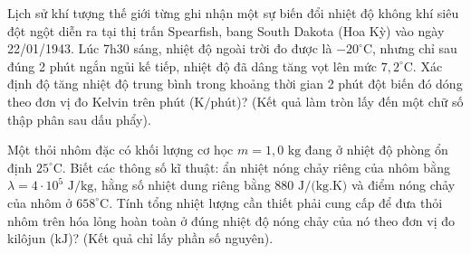\begin{ex}	Lịch sử khí tượng thế giới từng ghi nhận một sự biến đổi nhiệt độ không khí siêu đột ngột diễn ra tại thị trấn Spearfish, bang South Dakota (Hoa Kỳ) vào ngày 22/01/1943. Lúc 7h30 sáng, nhiệt độ ngoài trời đo được là $-20^\circ\text{C}$, nhưng chỉ sau đúng 2 phút ngắn ngủi kế tiếp, nhiệt độ đã dâng tăng vọt lên mức $7,2^\circ\text{C}$. Xác định độ tăng nhiệt độ trung bình trong khoảng thời gian 2 phút đột biến đó dóng theo đơn vị đo Kelvin trên phút ($\text{K/phút}$)? (Kết quả làm tròn lấy đến một chữ số thập phân sau dấu phẩy).

	\par{}
\end{ex}

\begin{ex}	Một thỏi nhôm đặc có khối lượng cơ học $m = 1,0\text{ kg}$ đang ở nhiệt độ phòng ổn định $25^\circ\text{C}$. Biết các thông số kĩ thuật: ẩn nhiệt nóng chảy riêng của nhôm bằng $\lambda = 4 \cdot 10^5\text{ J/kg}$, hằng số nhiệt dung riêng bằng $880\text{ J/(kg.K)}$ và điểm nóng chảy của nhôm ở $658^\circ\text{C}$. Tính tổng nhiệt lượng cần thiết phải cung cấp để đưa thỏi nhôm trên hóa lỏng hoàn toàn ở đúng nhiệt độ nóng chảy của nó theo đơn vị đo kilôjun ($\text{kJ}$)? (Kết quả chỉ lấy phần số nguyên).

	\par{}
\end{ex}

